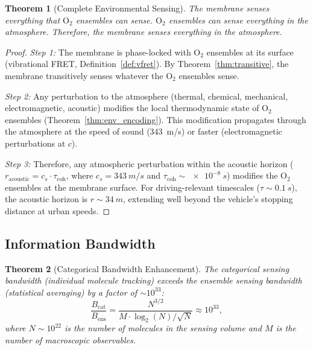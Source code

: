 \documentclass[twocolumn,10pt]{article}
\newtheorem{theorem}{Theorem}[section]
\theoremstyle{definition}
\theoremstyle{remark}
\begin{document}
\begin{theorem}[Complete Environmental Sensing]
\label{thm:complete_sensing}
The membrane senses everything that $\mathrm{O}_2$ ensembles can sense. $\mathrm{O}_2$ ensembles can sense everything in the atmosphere. Therefore, the membrane senses everything in the atmosphere.
\end{theorem}

\begin{proof}
\emph{Step 1:} The membrane is phase-locked with $\mathrm{O}_2$ ensembles at its surface (vibrational FRET, Definition~\ref{def:vfret}). By Theorem~\ref{thm:transitive}, the membrane transitively senses whatever the $\mathrm{O}_2$ ensembles sense.

\emph{Step 2:} Any perturbation to the atmosphere (thermal, chemical, mechanical, electromagnetic, acoustic) modifies the local thermodynamic state of $\mathrm{O}_2$ ensembles (Theorem~\ref{thm:env_encoding}). This modification propagates through the atmosphere at the speed of sound (\SI{343}{m/s}) or faster (electromagnetic perturbations at $c$).

\emph{Step 3:} Therefore, any atmospheric perturbation within the acoustic horizon ($r_{\mathrm{acoustic}} = c_s \cdot \tau_{\mathrm{coh}}$, where $c_s = \SI{343}{m/s}$ and $\tau_{\mathrm{coh}} \sim \SI{e-8}{s}$) modifies the $\mathrm{O}_2$ ensembles at the membrane surface. For driving-relevant timescales ($\tau \sim \SI{0.1}{s}$), the acoustic horizon is $r \sim \SI{34}{m}$, extending well beyond the vehicle's stopping distance at urban speeds.
\end{proof}

\subsection{Information Bandwidth}

\begin{theorem}[Categorical Bandwidth Enhancement]
\label{thm:bandwidth}
The categorical sensing bandwidth (individual molecule tracking) exceeds the ensemble sensing bandwidth (statistical averaging) by a factor of $\sim 10^{33}$:
\begin{equation}
  \frac{B_{\mathrm{cat}}}{B_{\mathrm{ens}}} = \frac{N^{3/2}}{M \cdot \log_2(N)/\sqrt{N}} \approx 10^{33},
  \label{eq:bandwidth_ratio}
\end{equation}
where $N \sim 10^{22}$ is the number of molecules in the sensing volume and $M$ is the number of macroscopic observables.
\end{theorem}
\end{document}
